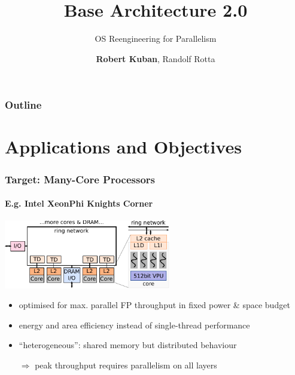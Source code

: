 \documentclass[9pt]{beamer}
\author{\textbf{Robert Kuban}, Randolf Rotta}
\title{Base Architecture 2.0}
\subtitle{OS Reengineering for Parallelism}
\begin{document}
\frame[plain]{
  \titlepage
}

\logo{\usebox{\mylogo}}

\begin{frame}
  \frametitle{Outline}
  \tableofcontents%
\end{frame}

\section{Applications and Objectives}

\begin{frame}
  \frametitle{Target: Many-Core Processors}
  \framesubtitle{E.g. Intel XeonPhi Knights Corner}

  \begin{center}
    \includegraphics[height=3cm]{figures/hw-xeonphi}
  \end{center}

  \begin{itemize}
  \item optimised for max. parallel FP throughput in fixed power \& space budget 
  \item energy and area efficiency instead of single-thread performance
  \item ``heterogeneous'': shared memory but \alert{distributed behaviour} 
  \item[$\Rightarrow$] peak throughput \alert{requires parallelism on all layers}
  \end{itemize}
\end{frame}
\end{document}
